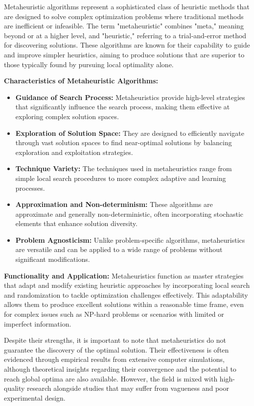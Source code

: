 \documentclass[
]{article}
\begin{document}
Metaheuristic algorithms represent a sophisticated class of heuristic methods that are designed to solve complex optimization problems where traditional methods are inefficient or infeasible. The term "metaheuristic" combines "meta," meaning beyond or at a higher level, and "heuristic," referring to a trial-and-error method for discovering solutions. These algorithms are known for their capability to guide and improve simpler heuristics, aiming to produce solutions that are superior to those typically found by pursuing local optimality alone.

\textbf{Characteristics of Metaheuristic Algorithms:}
\begin{itemize}
  \item \textbf{Guidance of Search Process:} Metaheuristics provide high-level strategies that significantly influence the search process, making them effective at exploring complex solution spaces.
  \item \textbf{Exploration of Solution Space:} They are designed to efficiently navigate through vast solution spaces to find near-optimal solutions by balancing exploration and exploitation strategies.
  \item \textbf{Technique Variety:} The techniques used in metaheuristics range from simple local search procedures to more complex adaptive and learning processes.
  \item \textbf{Approximation and Non-determinism:} These algorithms are approximate and generally non-deterministic, often incorporating stochastic elements that enhance solution diversity.
  \item \textbf{Problem Agnosticism:} Unlike problem-specific algorithms, metaheuristics are versatile and can be applied to a wide range of problems without significant modifications.
\end{itemize}

\textbf{Functionality and Application:}
Metaheuristics function as master strategies that adapt and modify existing heuristic approaches by incorporating local search and randomization to tackle optimization challenges effectively. This adaptability allows them to produce excellent solutions within a reasonable time frame, even for complex issues such as NP-hard problems or scenarios with limited or imperfect information.

Despite their strengths, it is important to note that metaheuristics do not guarantee the discovery of the optimal solution. Their effectiveness is often evidenced through empirical results from extensive computer simulations, although theoretical insights regarding their convergence and the potential to reach global optima are also available. However, the field is mixed with high-quality research alongside studies that may suffer from vagueness and poor experimental design.
\end{document}
